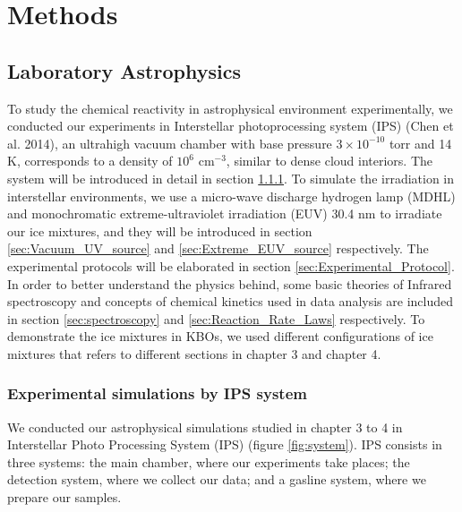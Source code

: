 \chapter{\protect Methods}

\section{Laboratory Astrophysics}
To study the chemical reactivity in astrophysical environment experimentally,
we conducted our experiments in Interstellar photoprocessing system (IPS) (Chen et al. 2014),
an ultrahigh vacuum chamber with base pressure $3 \times 10^{-10}$ torr and 14 K,
corresponds to a density of $10^6$ cm$^{-3}$, similar to dense cloud interiors.
The system will be introduced in detail in section \ref{sec:IPS_system}.
To simulate the irradiation in interstellar environments,
we use a micro-wave discharge hydrogen lamp (MDHL) and monochromatic extreme-ultraviolet irradiation (EUV) 30.4 nm to irradiate our ice mixtures,
and they will be introduced in section \ref{sec:Vacuum_UV_source} and \ref{sec:Extreme_EUV_source} respectively.
The experimental protocols will be elaborated in section \ref{sec:Experimental_Protocol}.
In order to better understand the physics behind, some basic theories of Infrared spectroscopy and concepts of chemical kinetics used in data analysis are included in section \ref{sec:spectroscopy} and \ref{sec:Reaction_Rate_Laws} respectively.
To demonstrate the ice mixtures in KBOs, we used different configurations of ice mixtures that refers to different sections in chapter 3 and chapter 4.\\

\subsection{Experimental simulations by IPS system}
\label{sec:IPS_system}

We conducted our astrophysical simulations studied in chapter 3 to 4 in Interstellar Photo Processing System (IPS) (figure \ref{fig:system}). IPS consists in three systems: the main chamber, where our experiments take places; the detection system, where we collect our data; and a gasline system, where we prepare our samples.

